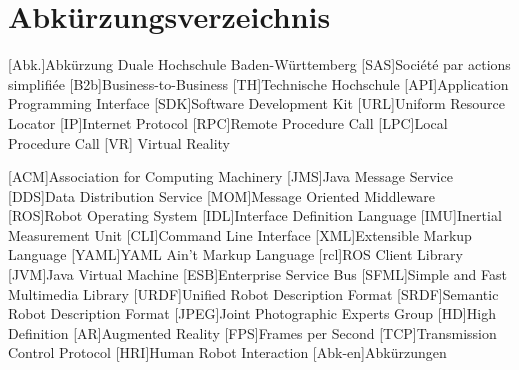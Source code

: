 
\chapter*{Abkürzungsverzeichnis}                   %

\begin{acronym}[DHBW]
  [Abk.]{Abkürzung}
   {Duale Hochschule Baden-Württemberg}
  [SAS]{Société par actions simplifiée}
  [B2b]{Business-to-Business}
  [TH]{Technische Hochschule}
  [API]{Application Programming Interface}
  [SDK]{Software Development Kit}
  [URL]{Uniform Resource Locator}
  [IP]{Internet Protocol}
  [RPC]{Remote Procedure Call}
  [LPC]{Local Procedure Call}
   [VR] {Virtual Reality}
  
  [ACM]{Association for Computing Machinery}
  [JMS]{Java Message Service}
  [DDS]{Data Distribution Service}
  [MOM]{Message Oriented Middleware}
  [ROS]{Robot Operating System}
  [IDL]{Interface Definition Language}
  [IMU]{Inertial Measurement Unit}
  [CLI]{Command Line Interface}
  [XML]{Extensible Markup Language}
  [YAML]{YAML Ain't Markup Language}
  [rcl]{ROS Client Library}
  [JVM]{Java Virtual Machine}
  [ESB]{Enterprise Service Bus}
  [SFML]{Simple and Fast Multimedia Library}
  [URDF]{Unified Robot Description Format}
  [SRDF]{Semantic Robot Description Format}
  [JPEG]{Joint Photographic Experts Group}
  [HD]{High Definition}
  [AR]{Augmented Reality}
  [FPS]{Frames per Second}
  [TCP]{Transmission Control Protocol}
  [HRI]{Human Robot Interaction}
  [Abk-en]{Abkürzungen}
\end{acronym}
